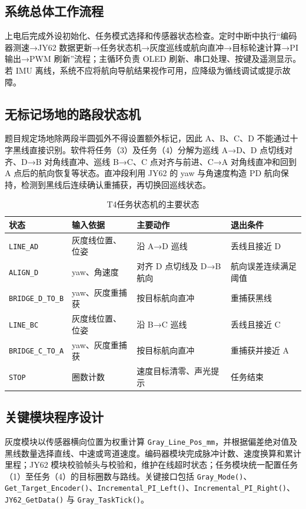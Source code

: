 \documentclass[12pt,a4paper,fontset=fandol]{ctexart}
\newcommand{\code}[1]{\texttt{\small #1}}
\begin{document}
\subsection{系统总体工作流程}
上电后完成外设初始化、任务模式选择和传感器状态检查。定时中断中执行“编码器测速→JY62 数据更新→任务状态机→灰度巡线或航向直冲→目标轮速计算→PI 输出→PWM 刷新”流程；主循环负责 OLED 刷新、串口处理、按键及遥测显示。若 IMU 离线，系统不应将航向导航结果视作可用，应降级为循线调试或提示故障。

\subsection{无标记场地的路段状态机}
题目规定场地除两段半圆弧外不得设置额外标记，因此 A、B、C、D 不能通过十字黑线直接识别。软件将任务（3）及任务（4）分解为巡线 A→D、D 点切线对齐、D→B 对角线直冲、巡线 B→C、C 点对齐与前进、C→A 对角线直冲和回到 A 点后的航向恢复等状态。直冲段利用 JY62 的 yaw 与角速度构造 PD 航向保持，检测到黑线后连续确认重捕获，再切换回巡线状态。

\begin{table}[H]
\centering
\caption{T4任务状态机的主要状态}
\begin{tabularx}{\textwidth}{p{2.6cm}p{2.5cm}Yp{2.7cm}}
\toprule
状态 & 输入依据 & 主要动作 & 退出条件\\
\midrule
\code{LINE\_AD} & 灰度线位置、位姿 & 沿 A→D 巡线 & 丢线且接近 D\\
\code{ALIGN\_D} & yaw、角速度 & 对齐 D 点切线及 D→B 航向 & 航向误差连续满足阈值\\
\code{BRIDGE\_D\_TO\_B} & yaw、灰度重捕获 & 按目标航向直冲 & 重捕获黑线\\
\code{LINE\_BC} & 灰度线位置、位姿 & 沿 B→C 巡线 & 丢线且接近 C\\
\code{BRIDGE\_C\_TO\_A} & yaw、灰度重捕获 & 按目标航向直冲 & 重捕获并接近 A\\
\code{STOP} & 圈数计数 & 速度目标清零、声光提示 & 任务结束\\
\bottomrule
\end{tabularx}
\end{table}

\subsection{关键模块程序设计}
灰度模块以传感器横向位置为权重计算 \code{Gray\_Line\_Pos\_mm}，并根据偏差绝对值及黑线数量选择直线、中速或弯道速度。编码器模块完成脉冲计数、速度换算和累计里程；JY62 模块校验帧头与校验和，维护在线超时状态；任务模块统一配置任务（1）至任务（4）的目标圈数与路线。关键接口包括 \code{Gray\_Mode()}、\code{Get\_Target\_Encoder()}、\code{Incremental\_PI\_Left()}、\code{Incremental\_PI\_Right()}、\code{JY62\_GetData()} 与 \code{Gray\_TaskTick()}。
\end{document}
